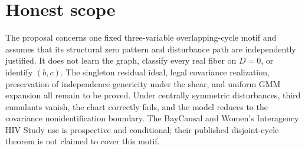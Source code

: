 \documentclass{article}
\begin{document}
\section{Honest scope}

The proposal concerns one fixed three-variable overlapping-cycle motif and assumes that its structural zero pattern and disturbance path are independently justified. It does not learn the graph, classify every real fiber on \(D=0\), or identify \((b,c)\). The singleton residual ideal, legal covariance realization, preservation of independence genericity under the shear, and uniform GMM expansion all remain to be proved. Under centrally symmetric disturbances, third cumulants vanish, the chart correctly fails, and the model reduces to the covariance nonidentification boundary. The BayCausal and Women's Interagency HIV Study use is prospective and conditional; their published disjoint-cycle theorem is not claimed to cover this motif.
\end{document}
